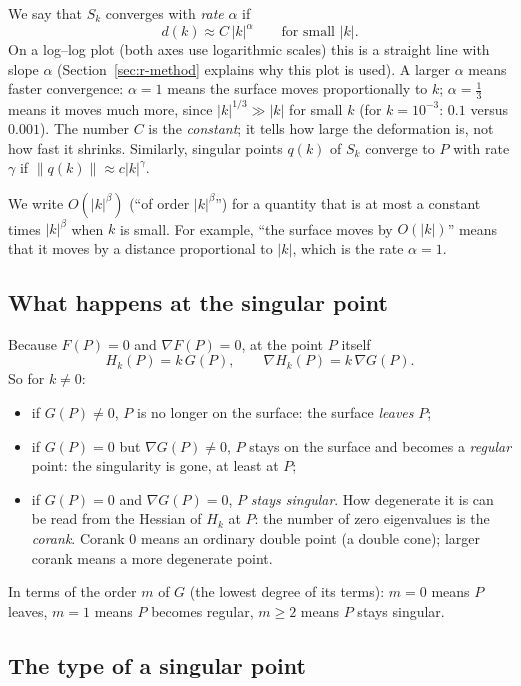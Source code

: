 \documentclass[12pt, a4paper]{article}
\theoremstyle{plain}
\theoremstyle{definition}
\theoremstyle{remark}
\theoremstyle{definition}
\begin{document}
We say that $S_k$ converges with \emph{rate} $\alpha$ if
\[
d(k)\approx C\,|k|^\alpha\qquad\text{for small }|k|.
\]
On a log--log plot (both axes use logarithmic scales) this is a straight line
with slope $\alpha$ (Section~\ref{sec:r-method} explains why this plot is used). A larger $\alpha$
means faster convergence: $\alpha=1$ means the surface moves proportionally to
$k$; $\alpha=\tfrac13$ means it moves much more, since $|k|^{1/3}\gg|k|$ for small
$k$ (for $k=10^{-3}$: $0.1$ versus $0.001$). The number $C$ is the
\emph{constant}; it tells how large the deformation is, not how fast it shrinks.
Similarly, singular points $q(k)$ of $S_k$ converge to $P$ with rate $\gamma$ if
$\|q(k)\|\approx c|k|^\gamma$.

We write $O(|k|^\beta)$ (``of order $|k|^\beta$'') for a quantity that is at most a
constant times $|k|^\beta$ when $k$ is small. For example, ``the surface moves by
$O(|k|)$'' means that it moves by a distance proportional to $|k|$, which is the
rate $\alpha=1$.

\subsection{What happens at the singular point}

Because $F(P)=0$ and $\nabla F(P)=0$, at the point $P$ itself
\[
H_k(P)=k\,G(P),\qquad \nabla H_k(P)=k\,\nabla G(P).
\]
So for $k\neq0$:
\begin{itemize}
    \item if $G(P)\neq0$, $P$ is no longer on the surface: the surface \emph{leaves} $P$;
    \item if $G(P)=0$ but $\nabla G(P)\neq0$, $P$ stays on the surface and becomes a
          \emph{regular} point: the singularity is gone, at least at $P$;
    \item if $G(P)=0$ and $\nabla G(P)=0$, $P$ \emph{stays singular}. How
          degenerate it is can be read from the Hessian of $H_k$ at $P$: the number of
          zero eigenvalues is the \emph{corank}. Corank $0$ means an ordinary double
          point (a double cone); larger corank means a more degenerate point.
\end{itemize}
In terms of the order $m$ of $G$ (the lowest degree of its terms): $m=0$
means $P$ leaves, $m=1$ means $P$ becomes regular, $m\ge2$ means $P$ stays singular.

\subsection{The type of a singular point}
\end{document}
